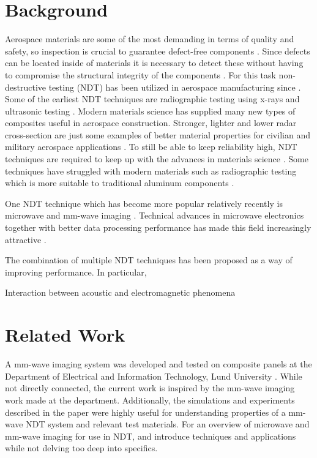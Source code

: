 \documentclass[11pt,twoside]{eitExjobb}
\begin{document}
	\section{Background}
	Aerospace materials are some of the most demanding in terms of quality and safety, so inspection is crucial to guarantee defect-free components \addref. Since defects can be located inside of materials it is necessary to detect these without having to compromise the structural integrity of the components \addref. For this task non-destructive testing (NDT) has been utilized in aerospace manufacturing since . Some of the earliest NDT techniques are radiographic testing using x-rays and ultrasonic testing \addref {}. Modern materials science has supplied many new types of composites useful in aerospace construction. Stronger, lighter and lower radar cross-section are just some examples of better material properties for civilian and military aerospace applications \addref. To still be able to keep reliability high, NDT techniques are required to keep up with the advances in materials science \addref. Some techniques have struggled with modern materials such as radiographic testing which is more suitable to traditional aluminum components \addref.
	
	One NDT technique which has become more popular relatively recently is microwave and mm-wave imaging \addref. Technical advances in microwave electronics together with better data processing performance has made this field increasingly attractive \addref. 
	
	The combination of multiple NDT techniques has been proposed as a way of improving performance. In particular, 
	
	Interaction between acoustic and electromagnetic phenomena 
	
	\section{Related Work}	
	A mm-wave imaging system was developed and tested on composite panels at the Department of Electrical and Information Technology, Lund University \cite{Helander2017}. While not directly connected, the current work is inspired by the mm-wave imaging work made at the department. Additionally, the simulations and experiments described in the paper were highly useful for understanding properties of a mm-wave NDT system and relevant test materials. For an overview of microwave and mm-wave imaging for use in NDT, \cite{Kharkovsky2007} and \cite{Dobmann2012} introduce techniques and applications while not delving too deep into specifics.
	
\end{document}
